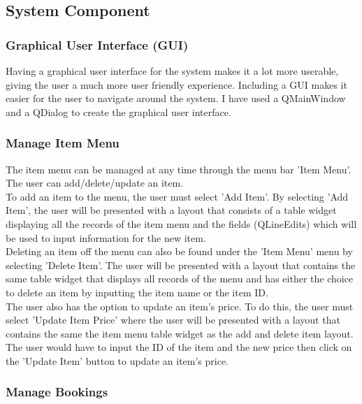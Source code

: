 \subsection{System Component}

\subsubsection{Graphical User Interface (GUI)}
Having a graphical user interface for the system makes it a lot more userable, giving the user a much more user friendly experience. Including a GUI makes it easier for the user to navigate around the system. I have used a QMainWindow and a QDialog to create the graphical user interface.

\subsubsection{Manage Item Menu}
The item menu can be managed at any time through the menu bar 'Item Menu'. The user can add/delete/update an item. \\

To add an item to the menu, the user must select 'Add Item'. By selecting 'Add Item', the user will be presented with a layout that consists of a table widget displaying all the records of the item menu and the fields (QLineEdits) which will be used to input information for the new item. \\

Deleting an item off the menu can also be found under the 'Item Menu' menu by selecting 'Delete Item'. The user will be presented with a layout that contains the same table widget that displays all records of the menu and has either the choice to delete an item by inputting the item name or the item ID. \\

The user also has the option to update an item's price. To do this, the user must select 'Update Item Price' where the user will be presented with a layout that contains the same the item menu table widget as the add and delete item layout. The user would have to input the ID of the item and the new price then click on the 'Update Item' button to update an item's price.


\subsubsection{Manage Bookings}

